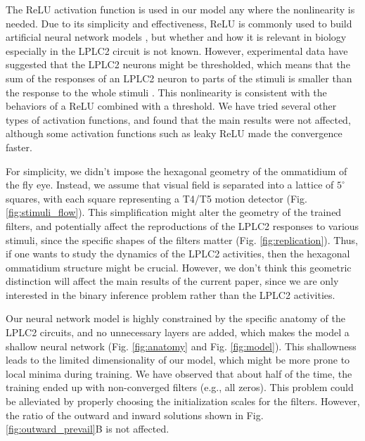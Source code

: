 \documentclass[pdftex,9pt,lineno]{elife}
\begin{document}

The ReLU activation function is used in our model any where the nonlinearity is needed. Due to its simplicity and effectiveness, ReLU is commonly used to build artificial neural network models \citep{glorot2011deep}, but whether and how it is relevant in biology especially in the LPLC2 circuit is not known. However, experimental data have suggested that the LPLC2 neurons might be thresholded, which means that the sum of the responses of an LPLC2 neuron to parts of the stimuli is smaller than the response to the whole stimuli \citep{klapoetke2017ultra}. This nonlinearity is consistent with the behaviors of a ReLU combined with a threshold. We have tried several other types of activation functions, and found that the main results were not affected, although some activation functions such as leaky ReLU made the convergence faster.

For simplicity, we didn't impose the hexagonal geometry of the ommatidium of the fly eye. Instead, we assume that visual field is separated into a lattice of $5^{\circ}$ squares, with each square representing a T4/T5 motion detector (Fig. \ref{fig:stimuli_flow}). This simplification might alter the geometry of the trained filters, and potentially affect the reproductions of the LPLC2 responses to various stimuli, since the specific shapes of the filters matter (Fig. \ref{fig:replication}). Thus, if one wants to study the dynamics of the LPLC2 activities, then the hexagonal ommatidium structure might be crucial. However, we don't think this geometric distinction will affect the main results of the current paper, since we are only interested in the binary inference problem rather than the LPLC2 activities.

Our neural network model is highly constrained by the specific anatomy of the LPLC2 circuits, and no unnecessary layers are added, which makes the model a shallow neural network (Fig. \ref{fig:anatomy} and Fig. \ref{fig:model}). This shallowness leads to the limited dimensionality of our model, which might be more prone to local minima during training. We have observed that about half of the time, the training ended up with non-converged filters (e.g., all zeros). This problem could be alleviated by properly choosing the initialization scales for the filters. However, the ratio of the outward and inward solutions shown in Fig. \ref{fig:outward_prevail}B is not affected.
\end{document}
